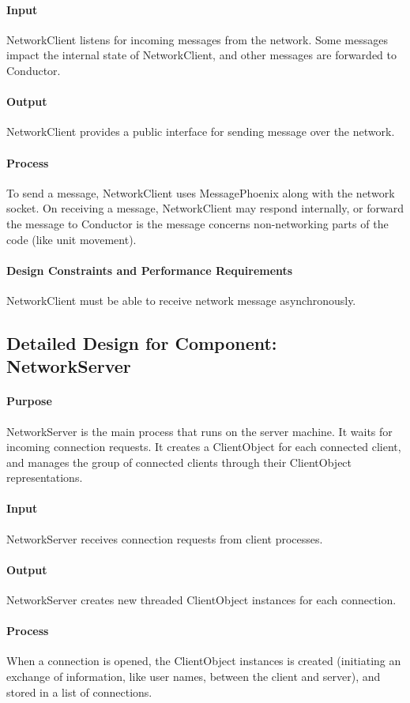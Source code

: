 \documentclass[12pt,a4paper,titlepage]{article}
\begin{document}
\paragraph{Input} NetworkClient listens for incoming messages from the network. Some messages impact the internal state of NetworkClient, and other messages are forwarded to Conductor.
\paragraph{Output} NetworkClient provides a public interface for sending message over the network.
\paragraph{Process} To send a message, NetworkClient uses MessagePhoenix along with the network socket. On receiving a message, NetworkClient may respond internally, or forward the message to Conductor is the message concerns non-networking parts of the code (like unit movement).
\paragraph{Design Constraints and Performance Requirements}
NetworkClient must be able to receive network message asynchronously. 

\subsection{Detailed Design for Component: NetworkServer }
\paragraph{Purpose} NetworkServer is the main process that runs on the server machine. It waits for incoming connection requests. It creates a ClientObject for each connected client, and manages the group of connected clients through their ClientObject representations. 
\paragraph{Input} NetworkServer receives connection requests from client processes.
\paragraph{Output} NetworkServer creates new threaded ClientObject instances for each connection.
\paragraph{Process} When a connection is opened, the ClientObject instances is created (initiating an exchange of information, like user names, between the client and server), and stored in a list of connections.
\end{document}
